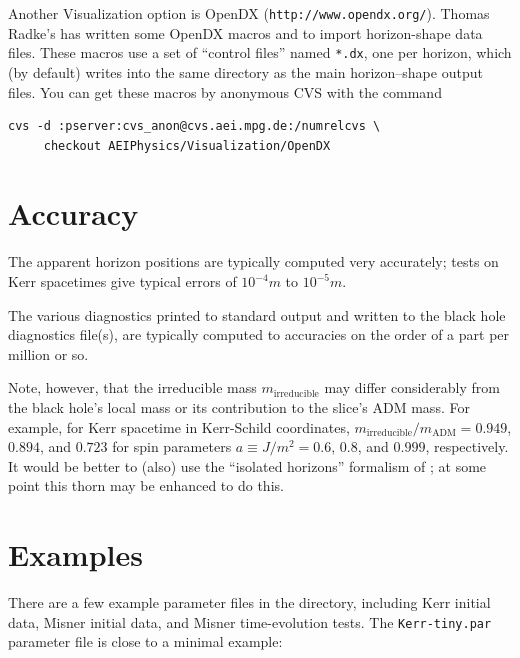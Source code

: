 Another Visualization option is OpenDX (\verb|http://www.opendx.org/|).
Thomas Radke's has written some OpenDX macros
and 
to import  horizon-shape data files.  
These macros use a set of ``control files'' named \verb|*.dx|,
one per horizon, which  (by default) writes
into the same directory as the main horizon--shape output files.
You can get these macros by anonymous CVS with the command
\begin{verbatim}
cvs -d :pserver:cvs_anon@cvs.aei.mpg.de:/numrelcvs \
     checkout AEIPhysics/Visualization/OpenDX
\end{verbatim}


\section{Accuracy}

The apparent horizon positions are typically computed very accurately;
tests on Kerr spacetimes give typical errors of $10^{-4}m$ to $10^{-5}m$.

The various diagnostics printed to standard output and written to the
black hole diagnostics file(s), are typically computed to accuracies
on the order of a part per million or so.

Note, however, that the irreducible mass $m_\text{irreducible}$
may differ considerably from the black hole's local mass or its
contribution to the slice's ADM mass.  For example, for Kerr spacetime
in Kerr-Schild coordinates,
$m_\text{irreducible}/m_\text{ADM} = 0.949$, $0.894$, and $0.723$
for spin parameters $a \equiv J/m^2 = 0.6$, $0.8$, and $0.999$, respectively.
It would be better to (also) use the ``isolated horizons'' formalism of
\cite{AHFinderDirect/Dreyer-etal-2002-isolated-horizons};
at some point this thorn may be enhanced to do this.


\section{Examples}
\label{AHFinderDirect/sect-examples}

There are a few example parameter files in the  directory,
including Kerr initial data, Misner initial data, and Misner time-evolution
tests.  The \verb|Kerr-tiny.par| parameter file is close to a minimal
\thorn{AHFinderDirect} example:

